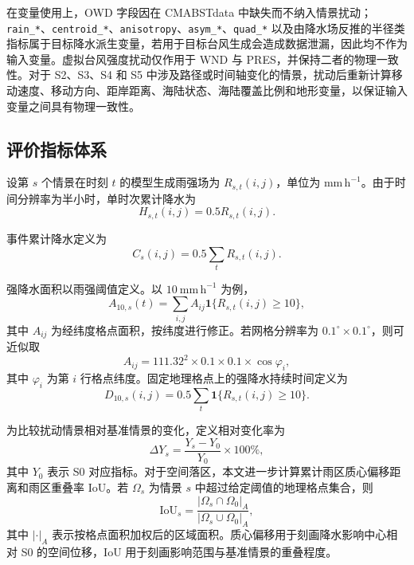 \documentclass[UTF8,a4paper,zihao=5,fontset=fandol]{ctexart}
\numberwithin{equation}{section}
\numberwithin{figure}{section}
\numberwithin{table}{section}
\begin{document}
在变量使用上，OWD 字段因在 CMABSTdata 中缺失而不纳入情景扰动；\verb|rain_*|、\verb|centroid_*|、\verb|anisotropy|、\verb|asym_*|、\verb|quad_*| 以及由降水场反推的半径类指标属于目标降水派生变量，若用于目标台风生成会造成数据泄漏，因此均不作为输入变量。虚拟台风强度扰动仅作用于 WND 与 PRES，并保持二者的物理一致性。对于 S2、S3、S4 和 S5 中涉及路径或时间轴变化的情景，扰动后重新计算移动速度、移动方向、距岸距离、海陆状态、海陆覆盖比例和地形变量，以保证输入变量之间具有物理一致性。

\subsection{评价指标体系}

设第 $s$ 个情景在时刻 $t$ 的模型生成雨强场为 $R_{s,t}(i,j)$，单位为 $\mathrm{mm\,h^{-1}}$。由于时间分辨率为半小时，单时次累计降水为
\begin{equation}
H_{s,t}(i,j)=0.5R_{s,t}(i,j).
\end{equation}

事件累计降水定义为
\begin{equation}
C_s(i,j)=0.5\sum_t R_{s,t}(i,j).
\end{equation}

强降水面积以雨强阈值定义。以 $10\ \mathrm{mm\,h^{-1}}$ 为例，
\begin{equation}
A_{10,s}(t)=\sum_{i,j} A_{ij}\mathbf{1}\{R_{s,t}(i,j)\ge 10\},
\end{equation}
其中 $A_{ij}$ 为经纬度格点面积，按纬度进行修正。若网格分辨率为 $0.1^\circ\times0.1^\circ$，则可近似取
\begin{equation}
A_{ij}=111.32^2\times 0.1\times 0.1\times \cos\varphi_i ,
\end{equation}
其中 $\varphi_i$ 为第 $i$ 行格点纬度。固定地理格点上的强降水持续时间定义为
\begin{equation}
D_{10,s}(i,j)=0.5\sum_t \mathbf{1}\{R_{s,t}(i,j)\ge 10\}.
\end{equation}

为比较扰动情景相对基准情景的变化，定义相对变化率为
\begin{equation}
\Delta Y_s=\frac{Y_s-Y_0}{Y_0}\times 100\%,
\end{equation}
其中 $Y_0$ 表示 S0 对应指标。对于空间落区，本文进一步计算累计雨区质心偏移距离和雨区重叠率 IoU。若 $\Omega_s$ 为情景 $s$ 中超过给定阈值的地理格点集合，则
\begin{equation}
\mathrm{IoU}_s=\frac{|\Omega_s\cap\Omega_0|_A}{|\Omega_s\cup\Omega_0|_A},
\end{equation}
其中 $|\cdot|_A$ 表示按格点面积加权后的区域面积。质心偏移用于刻画降水影响中心相对 S0 的空间位移，IoU 用于刻画影响范围与基准情景的重叠程度。
\end{document}
